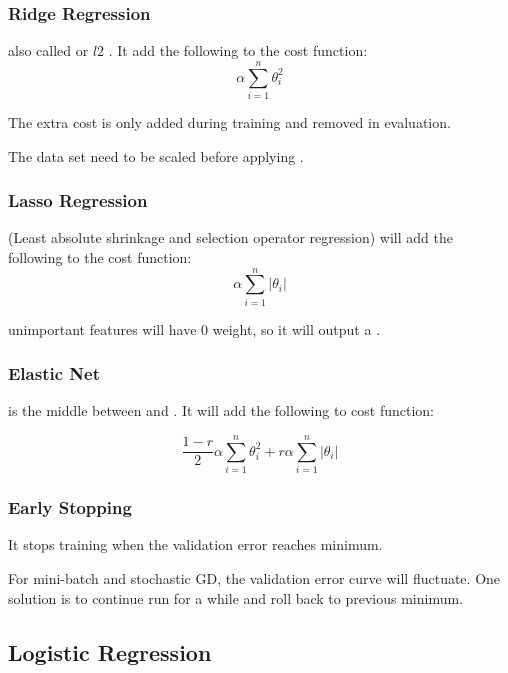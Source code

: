 \subsubsection{Ridge Regression}

also called  or $l2$ . It add the following to the cost function:
\begin{equation}
	\alpha \sum_{i=1}^n \theta_i^2
\end{equation}

The extra cost is only added during training and removed in evaluation.

The data set need to be scaled before applying .

\subsubsection{Lasso Regression}
 (Least absolute shrinkage and selection operator regression) will add the following to the cost function:
\begin{equation}
	\alpha \sum_{i=1}^n |\theta_i|
\end{equation}

unimportant features will have $0$ weight, so it will output a .

\subsubsection{Elastic Net}
 is the middle between  and . It will add the following to cost function:

\begin{equation}
	\frac{1-r}{2} \alpha \sum_{i=1}^n \theta_i^2 + r \alpha \sum_{i=1}^n |\theta_i|
\end{equation}


\subsubsection{Early Stopping}

It stops training when the validation error reaches minimum. 

For mini-batch and stochastic GD, the validation error curve will fluctuate. One solution is to continue run for a while and roll back to previous minimum.


\subsection{Logistic Regression}

